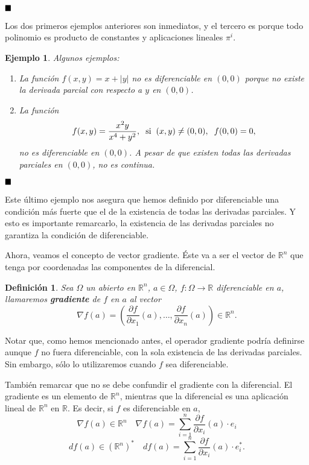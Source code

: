 \documentclass[12pt]{article}
\newtheorem{definition}[theorem]{Definición}
\newtheorem{example}{Ejemplo}[theorem]
\begin{document}
$\hfill \blacksquare$

Los dos primeros ejemplos anteriores son inmediatos, y el tercero es porque todo polinomio es producto de constantes y aplicaciones lineales $\pi^i$.

\begin{example}Algunos ejemplos: 

\begin{enumerate}
\item La función $f(x,y) = x + |y|$ no es diferenciable en $(0,0)$ porque no existe la derivada parcial con respecto a $y$ en $(0,0)$.
\item La función $$f(x,y)= \dfrac{x^2y}{x^4+y^2}, \hspace{0.2cm} \text{si} \hspace{0.2cm} (x,y) \neq (0,0), \hspace{0.2cm} f(0,0) = 0,$$ no es diferenciable en $(0,0)$. A pesar de que existen todas las derivadas parciales en $(0,0)$, no es continua.
\end{enumerate}
\end{example}

$\hfill \blacksquare$

Este último ejemplo nos asegura que hemos definido por diferenciable una condición más fuerte que el de la existencia de todas las derivadas parciales. Y esto es importante remarcarlo, la existencia de las derivadas parciales no garantiza la condición de diferenciable.

Ahora, veamos el concepto de vector gradiente. Éste va a ser el vector de $\mathbb{R}^n$ que tenga por coordenadas las componentes de la diferencial. 

\begin{definition}Sea $\Omega$ un abierto en $\mathbb{R}^n$, $a \in \Omega$, $f \colon \Omega \longrightarrow \mathbb{R}$ diferenciable en $a$, llamaremos \textbf{gradiente} de $f$ en $a$ al vector $$\nabla f(a) = \left( \dfrac{\partial f}{\partial x_1}(a), \ldots, \dfrac{\partial f}{\partial x_n} (a) \right) \in \mathbb{R}^n.$$
\end{definition}

Notar que, como hemos mencionado antes, el operador gradiente podría definirse aunque $f$ no fuera diferenciable, con la sola existencia de las derivadas parciales. Sin embargo, sólo lo utilizaremos cuando $f$ sea diferenciable.

También remarcar que no se debe confundir el gradiente con la diferencial. El gradiente es un elemento de $\mathbb{R}^n$, mientras que la diferencial es una aplicación lineal de $\mathbb{R}^n$ en $\mathbb{R}$. Es decir, si $f$ es diferenciable en $a$, $$\nabla f(a) \in \mathbb{R}^n \quad \nabla f(a)  = \sum_{i=1}^n\dfrac{\partial f}{\partial x_i}(a) \cdot e_i$$ $$df(a) \in (\mathbb{R}^n)^\ast \quad df(a) = \sum_{i=1}^n\dfrac{\partial f}{\partial x_i} (a) \cdot e_i^\ast.$$
\end{document}
